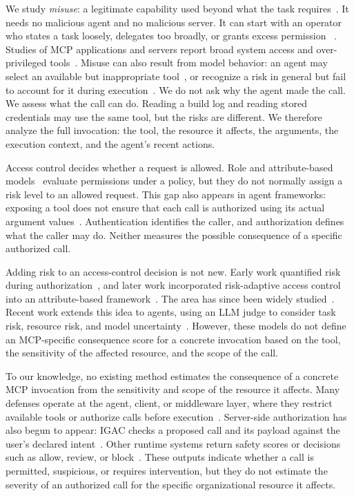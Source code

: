 \documentclass[sigconf]{acmart}
\begin{document}
We study \emph{misuse}: a legitimate capability used beyond what the task requires~\cite{anderson1980threat}. It needs no malicious agent and no malicious server. It can start with an operator who states a task loosely, delegates too broadly, or grants excess permission~ \cite{owasp2025llm06} . Studies of MCP
applications and servers report broad system access and over-privileged
tools~\cite{li2025privilege,huang2026auditing}. Misuse can also result from
model behavior: an agent may select an available but inappropriate
tool~\cite{yin2025reasoningtrap}, or recognize a risk in general but fail to
account for it during execution~\cite{tang2025riskknowledge}. We do not ask why the agent made the call. We assess what the call can do.
Reading a build log and reading stored credentials may use the same tool, but
the risks are different. We therefore analyze the full invocation: the tool,
the resource it affects, the arguments, the execution context, and the agent's
recent actions.



Access control decides whether a request is allowed. Role and attribute-based
models~\cite{sandhu1996rbac,hu2014abac} evaluate permissions under a policy,
but they do not normally assign a risk level to an allowed request. This gap
also appears in agent frameworks: exposing a tool does not ensure that each call
is authorized using its actual argument values~\cite{mellafe2026capability}.
Authentication identifies the caller, and authorization defines what the caller
may do. Neither measures the possible consequence of a specific authorized
call.


Adding risk to an access-control decision is not new. Early work quantified risk
during authorization~\cite{cheng2007fuzzymls}, and later work incorporated
risk-adaptive access control into an attribute-based
framework~\cite{kandala2011radac}. The area has since been widely
studied~\cite{atlam2020riskbased}. Recent work extends this idea to agents,
using an LLM judge to consider task risk, resource risk, and model
uncertainty~\cite{fleming2025tbac}. However, these models do not define an
MCP-specific consequence score for a concrete invocation based on the tool, the
sensitivity of the affected resource, and the scope of the call.


To our knowledge, no existing method estimates the consequence of a concrete
MCP invocation from the sensitivity and scope of the resource it affects. Many
defenses operate at the agent, client, or middleware layer, where they restrict
available tools or authorize calls before
execution~\cite{shi2025progent,zhu2025miniscope,betser2026agentrim,
li2026conleash,abaev2026agentguardian}. Server-side authorization has also begun
to appear: IGAC checks a proposed call and its payload against the user's
declared intent~\cite{zhu2026igac}. Other runtime systems return safety scores
or decisions such as allow, review, or
block~\cite{yang2026agenttrust,zhang2026stars,hossain2026nexus}. These outputs
indicate whether a call is permitted, suspicious, or requires intervention, but
they do not estimate the severity of an authorized call for the specific
organizational resource it affects.
\end{document}
